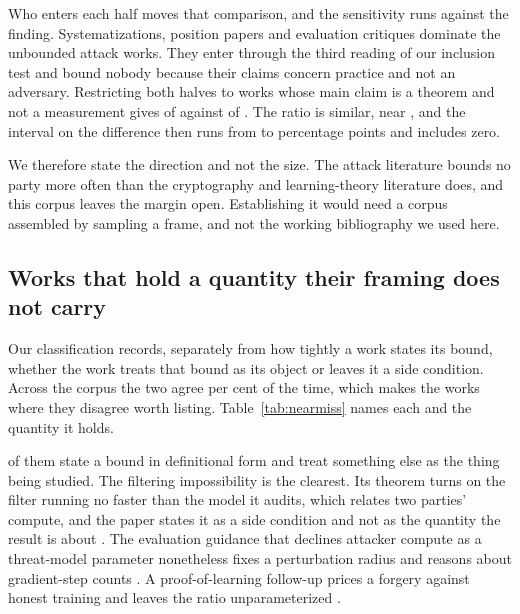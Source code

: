 Who enters each half moves that comparison, and the sensitivity runs against
the finding. Systematizations, position papers and evaluation
critiques dominate the unbounded attack works. They enter through the third
reading of our inclusion test and bound nobody because their claims concern
practice and not an adversary. Restricting both halves to works whose main
claim is a theorem and not a measurement gives \ThmAttackUnbound{} of
\ThmAttack{} against
\ThmOtherUnbound{} of \ThmOther{}. The ratio is similar, near \ThmRatio{}, and
the interval on the difference then runs from \ThmDiffLo{} to \ThmDiffHi{}
percentage points and includes zero.

We therefore state the direction and not the size. The attack literature
bounds no party more often than the cryptography and learning-theory
literature does, and this corpus leaves the margin open. Establishing it would
need a corpus assembled by sampling a frame, and not the working bibliography
we used here.

\subsection{Works that hold a quantity their framing does not carry}

Our classification records, separately from how tightly a work states its
bound, whether the work treats that bound as its object or leaves it a side
condition. Across the corpus the two agree \AssessedPredictable{} per cent of
the time, which makes the \NearMiss{} works where they disagree worth listing.
Table~\ref{tab:nearmiss} names each and the quantity it holds.



\NearMissA{} of them state a bound in definitional form and treat something else
as the thing being studied. The filtering impossibility is the clearest. Its
theorem turns on the filter running no faster than the model it audits, which
relates two parties' compute, and the paper states it as a side
condition and not as the quantity the result is about \cite{BGGKRR26}. The
evaluation guidance that declines attacker compute as a threat-model parameter
nonetheless fixes a perturbation radius and reasons about gradient-step counts
\cite{CAPBRTGMK19}. A proof-of-learning follow-up prices a forgery against
honest training and leaves the ratio unparameterized \cite{ZFWCSXZ26}.

